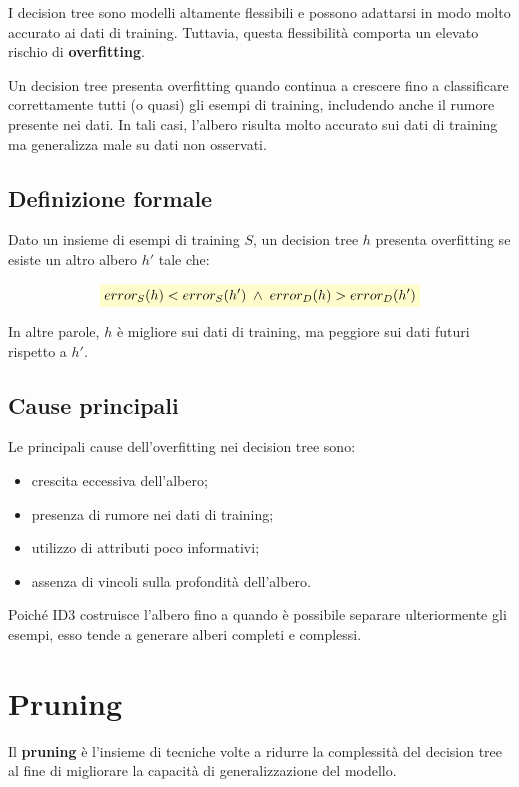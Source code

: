 \documentclass[a4paper,12pt]{report}
\newcommand{\highlight}[1]{%
\colorbox{yellow!20}{$\displaystyle #1$}%
}
\begin{document}
I decision tree sono modelli altamente flessibili e possono adattarsi in modo molto accurato ai dati di training.
Tuttavia, questa flessibilità comporta un elevato rischio di \textbf{overfitting}.

Un decision tree presenta overfitting quando continua a crescere fino a classificare correttamente tutti (o quasi) gli esempi di training, includendo anche il rumore presente nei dati.
In tali casi, l’albero risulta molto accurato sui dati di training ma generalizza male su dati non osservati.

\subsection*{Definizione formale}

Dato un insieme di esempi di training \( S \), un decision tree \( h \) presenta overfitting se esiste un altro albero \( h' \) tale che:

\[
\highlight{
error_S(h) < error_S(h') \;\land\; error_D(h) > error_D(h') }
\]

In altre parole, \( h \) è migliore sui dati di training, ma peggiore sui dati futuri rispetto a \( h' \).

\subsection*{Cause principali}

Le principali cause dell’overfitting nei decision tree sono:
\begin{itemize}
    \item crescita eccessiva dell’albero;
    \item presenza di rumore nei dati di training;
    \item utilizzo di attributi poco informativi;
    \item assenza di vincoli sulla profondità dell’albero.
\end{itemize}

Poiché ID3 costruisce l’albero fino a quando è possibile separare ulteriormente gli esempi, esso tende a generare alberi completi e complessi.

\section{Pruning}

Il \textbf{pruning} è l’insieme di tecniche volte a ridurre la complessità del decision tree al fine di migliorare la capacità di generalizzazione del modello.
\end{document}
